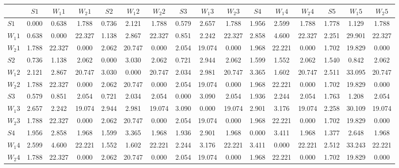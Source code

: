 \begin{table*}[h!]
\begin{center}
\begin{tabular}{| l | c | c | c | c | c | c | c | c | c | c | c | c | c | c | c |}\hline
 & $S1$ & $W_1 1$ & $W_2 1$ & $S2$ & $W_1 2$ & $W_2 2$ & $S3$ & $W_1 3$ & $W_2 3$ & $S4$ & $W_1 4$ & $W_2 4$ & $S5$ & $W_1 5$ & $W_2 5$ \\\hline
$S1$ & 0.000  & 0.638  & 1.788  & 0.736  & 2.121  & 1.788  & 0.579  & 2.657  & 1.788  & 1.956  & 2.599  & 1.788  & 1.778  & 1.129  & 1.788 \\\hline
$W_1 1$ & 0.638  & 0.000  & 22.327  & 1.138  & 2.867  & 22.327  & 0.851  & 2.242  & 22.327  & 2.858  & 4.600  & 22.327  & 2.251  & 29.901  & 22.327 \\\hline
$W_2 1$ & 1.788  & 22.327  & 0.000  & 2.062  & 20.747  & 0.000  & 2.054  & 19.074  & 0.000  & 1.968  & 22.221  & 0.000  & 1.702  & 19.829  & 0.000 \\\hline
$S2$ & 0.736  & 1.138  & 2.062  & 0.000  & 3.030  & 2.062  & 0.721  & 2.944  & 2.062  & 1.599  & 1.552  & 2.062  & 1.540  & 0.842  & 2.062 \\\hline
$W_1 2$ & 2.121  & 2.867  & 20.747  & 3.030  & 0.000  & 20.747  & 2.034  & 2.981  & 20.747  & 3.365  & 1.602  & 20.747  & 2.511  & 33.095  & 20.747 \\\hline
$W_2 2$ & 1.788  & 22.327  & 0.000  & 2.062  & 20.747  & 0.000  & 2.054  & 19.074  & 0.000  & 1.968  & 22.221  & 0.000  & 1.702  & 19.829  & 0.000 \\\hline
$S3$ & 0.579  & 0.851  & 2.054  & 0.721  & 2.034  & 2.054  & 0.000  & 3.090  & 2.054  & 1.936  & 2.244  & 2.054  & 1.763  & 1.208  & 2.054 \\\hline
$W_1 3$ & 2.657  & 2.242  & 19.074  & 2.944  & 2.981  & 19.074  & 3.090  & 0.000  & 19.074  & 2.901  & 3.176  & 19.074  & 2.258  & 30.109  & 19.074 \\\hline
$W_2 3$ & 1.788  & 22.327  & 0.000  & 2.062  & 20.747  & 0.000  & 2.054  & 19.074  & 0.000  & 1.968  & 22.221  & 0.000  & 1.702  & 19.829  & 0.000 \\\hline
$S4$ & 1.956  & 2.858  & 1.968  & 1.599  & 3.365  & 1.968  & 1.936  & 2.901  & 1.968  & 0.000  & 3.411  & 1.968  & 1.377  & 2.648  & 1.968 \\\hline
$W_1 4$ & 2.599  & 4.600  & 22.221  & 1.552  & 1.602  & 22.221  & 2.244  & 3.176  & 22.221  & 3.411  & 0.000  & 22.221  & 2.512  & 33.243  & 22.221 \\\hline
$W_2 4$ & 1.788  & 22.327  & 0.000  & 2.062  & 20.747  & 0.000  & 2.054  & 19.074  & 0.000  & 1.968  & 22.221  & 0.000  & 1.702  & 19.829  & 0.000 \\\hline

\end{tabular}
\end{center}
\end{table*}
